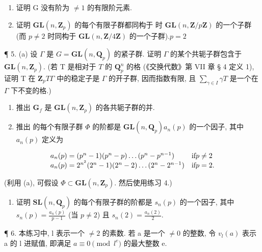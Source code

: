 \begin{enumerate}
\def\labelenumi{(\alph{enumi})}
\item
  证明 G 没有阶为 \(\neq 1\) 的有限阶元素.
\item
  证明 \(\mathbf{GL}(n, \mathbf{Z}_p)\) 的每个有限子群都同构于  时 \(\mathbf{GL}(n, \mathbf{Z} / p\mathbf{Z})\) 的一个子群 (而 \(p \neq 2\) 时同构于 \(\mathbf{GL}(n, \mathbf{Z} / 4\mathbf{Z})\) 的一个子群).\(p = 2\)
\end{enumerate}

¶ 5. (a) 设 \(\Gamma\) 是 \(G = \mathbf{GL}(n, \mathbf{Q}_p)\) 的紧子群. 证明 \(\Gamma\) 的某个共轭子群包含于 \(\mathbf{GL}(n, \mathbf{Z}_p)\). (若 T 是相对于 \(T\) 的 \(\mathbf{Q}_p^n\) 的格 (《交换代数》第 VII 章 § 4 定义 1), 证明 T 在 \(\mathbf{Z}_p\)\(T\)\(\Gamma\) 中的稳定子是 \(\Gamma\) 的开子群, 因而指数有限, 且 \(\sum_{\gamma \in I} \gamma T\) 是一个在 \(\Gamma\) 下不变的格.)

\begin{enumerate}
\def\labelenumi{(\alph{enumi})}
\setcounter{enumi}{1}
\item
  推出 \(\mathbf{G}_f\) 是 \(\mathbf{GL}(n,\mathbf{Z}_p)\) 的各共轭子群的并.
\item
  推出  的每个有限子群 \(\Phi\) 的阶都是 \(\mathbf{GL}(n, \mathbf{Q}_p)\)\(a_n(p)\) 的一个因子, 其中 \(a_n(p)\) 定义为
\end{enumerate}

\[
\begin{array}{l l} a _ {n} (p) = (p ^ {n} - 1) (p ^ {n} - p) \ldots (p ^ {n} - p ^ {n - 1}) & \text {if} p \neq 2 \\ a _ {n} (p) = 2 ^ {n ^ {2}} (2 ^ {n} - 1) (2 ^ {n} - 2) \ldots (2 ^ {n} - 2 ^ {n - 1}) & \text {if} p = 2. \end{array}
\]

(利用 (a), 可假设 \(\Phi \subset \mathbf{GL}(n, \mathbf{Z}_p)\). 然后使用练习 4.)

\begin{enumerate}
\def\labelenumi{(\alph{enumi})}
\setcounter{enumi}{3}
\tightlist
\item
  证明 \(\mathbf{SL}(n, \mathbf{Q}_p)\) 的每个有限子群的阶都是 \(s_n(p)\) 的一个因子, 其中 \(s_n(p) = \frac{a_n(p)}{p - 1}\) (当 \(p \neq 2\)) 且 \(s_n(2) = \frac{a_n(2)}{2}\).
\end{enumerate}

¶ 6. 本练习中, l 表示一个 \(\neq2\) 的素数. 若 a 是一个 \(\neq0\) 的整数, 令 \(v_{l}(a)\) 表示 a 的 l 进赋值, 即满足 \(a\equiv0\pmod{l^{e}}\) 的最大整数 e.

